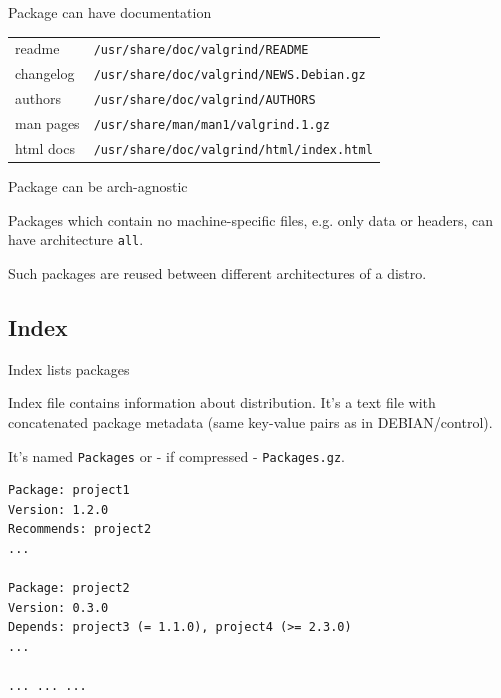 \documentclass{beamer}
\begin{document}
\begin{frame}[fragile]{Package can have documentation}
    \begin{block}{}
        \renewcommand{\arraystretch}{1.5}
        \begin{tabular}{l l}
            readme & \small\verb|/usr/share/doc/valgrind/README| \\
            changelog & \small\verb|/usr/share/doc/valgrind/NEWS.Debian.gz| \\
            authors & \small\verb|/usr/share/doc/valgrind/AUTHORS| \\
            man pages & \small\verb|/usr/share/man/man1/valgrind.1.gz| \\
            html docs & \small\verb|/usr/share/doc/valgrind/html/index.html| \\
        \end{tabular}
    \end{block}
\end{frame}

\begin{frame}[fragile]{Package can be arch-agnostic}
    \begin{block}{}
        Packages which contain no machine-specific files,
        e.g. only data or headers, can have architecture \verb|all|.
    \end{block}
    \begin{block}{}
        Such packages are reused
        between different architectures of a distro.
    \end{block}
\end{frame}

\subsection{Index}

\begin{frame}[fragile]{Index lists packages}
    \begin{block}{}
        Index file contains information about distribution.
        It's a text file with concatenated package metadata
        (same key-value pairs as in DEBIAN/control).
    \end{block}
    \begin{block}{}
        It's named \verb|Packages| or - if compressed - \verb|Packages.gz|.
    \end{block}
\begin{lstlisting}[style=Console]
Package: project1
Version: 1.2.0
Recommends: project2
...

Package: project2
Version: 0.3.0
Depends: project3 (= 1.1.0), project4 (>= 2.3.0)
...

... ... ...
\end{lstlisting}
\end{frame}
\end{document}
